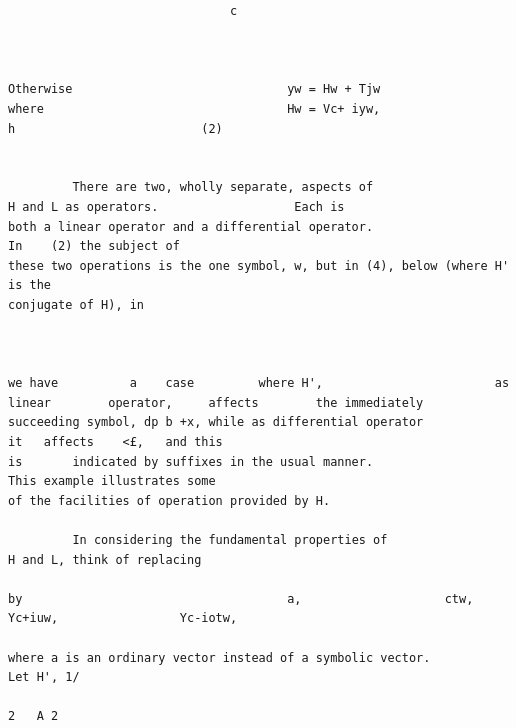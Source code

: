 \documentclass[10pt]{article}
\begin{document}
\begin{verbatim}
                               c



Otherwise                              yw = Hw + Tjw
where                                  Hw = Vc+ iyw,                                                       h                          (2)


         There are two, wholly separate, aspects of                                      H and L as operators.                   Each is
both a linear operator and a differential operator.                                                       In    (2) the subject of
these two operations is the one symbol, w, but in (4), below (where H' is the
conjugate of H), in



we have          a    case         where H',                        as   linear        operator,     affects        the immediately
succeeding symbol, dp b +x, while as differential operator                                                 it   affects    <£,   and this
is       indicated by suffixes in the usual manner.                                           This example illustrates some
of the facilities of operation provided by H.

         In considering the fundamental properties of                                         H and L, think of replacing

by                                     a,                    ctw,         Yc+iuw,                 Yc-iotw,

where a is an ordinary vector instead of a symbolic vector.                                                                Let H', 1/
                                                                                                                       2   A 2


\end{verbatim}
\clearpage
\end{document}
